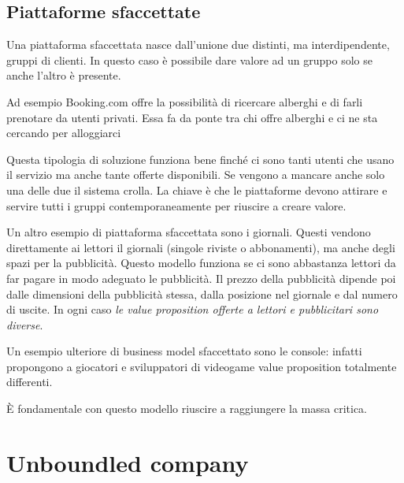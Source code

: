 \section{Piattaforme sfaccettate}

Una piattaforma sfaccettata nasce dall'unione due distinti, ma interdipendente,
gruppi di clienti. In questo caso è possibile dare valore ad un gruppo solo se anche l'altro è presente.

\begin{example}
Ad esempio Booking.com offre la possibilità di ricercare alberghi e di farli
prenotare da utenti privati. Essa fa da ponte tra chi offre alberghi e ci ne
sta cercando per alloggiarci
\end{example}

Questa tipologia di soluzione funziona bene finché ci sono tanti utenti che
usano il servizio ma anche tante offerte disponibili. Se vengono a mancare
anche solo una delle due il sistema crolla. La chiave è che le piattaforme
devono attirare e servire tutti i gruppi contemporaneamente per riuscire a
creare valore.

\begin{example}[Pubblicità]
Un altro esempio di piattaforma sfaccettata sono i giornali. Questi vendono direttamente ai lettori il giornali (singole riviste o abbonamenti), ma anche degli spazi per la pubblicità. Questo modello funziona se ci sono abbastanza lettori da far pagare in modo adeguato le pubblicità. Il prezzo della pubblicità dipende poi dalle dimensioni della pubblicità stessa, dalla posizione nel giornale e dal numero di uscite. In ogni caso \emph{le value proposition offerte a lettori e pubblicitari sono diverse}.
\end{example}

\begin{example}
Un esempio ulteriore di business model sfaccettato sono le console: infatti propongono a giocatori e sviluppatori di videogame value proposition totalmente differenti.
\end{example}


È fondamentale con questo modello riuscire a raggiungere la massa critica.

\chapter{Unboundled company}

